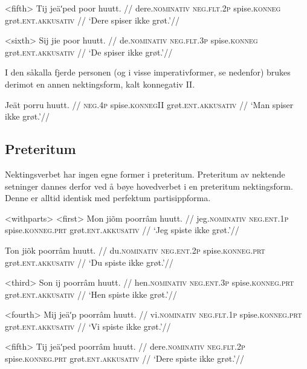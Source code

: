\a<fifth>
\begingl %
\gla Tij jeäʹped poor huutt. //
\glb dere.\textsc{nominativ} \textsc{neg.flt.2p} spise.\textsc{konneg} grøt.\textsc{ent.akkusativ} //
\glft `Dere spiser ikke grøt.'//
\endgl

\a<sixth>
\begingl %
\gla Sij jie poor huutt. //
\glb de.\textsc{nominativ} \textsc{neg.flt.3p} spise.\textsc{konneg} grøt.\textsc{ent.akkusativ} //
\glft `De spiser ikke grøt.'//
\endgl
\xe

I den såkalla fjerde personen (og i visse imperativformer, se nedenfor) brukes derimot en annen nektingsform, kalt konnegativ II.

\begingl %
\gla Jeät porru huutt. //
\glb \textsc{neg.4p} spise.\textsc{konnegII} grøt.\textsc{ent.akkusativ} //
\glft `Man spiser ikke grøt.'//
\endgl

\xe


\subsection{Preteritum}

Nektingsverbet har ingen egne former i preteritum. Preteritum av nektende setninger dannes derfor ved å bøye hovedverbet i en preteritum nektingsform. Denne er alltid identisk med perfektum partisippforma.

\pex<withparts> %
\a<first> %
\begingl %
\gla Mon jiõm poorrâm huutt. //
\glb jeg.\textsc{nominativ} \textsc{neg.ent.1p} spise.\textsc{konneg.prt} grøt.\textsc{ent.akkusativ} //
\glft `Jeg spiste ikke grøt.'//
\endgl

\begingl %
\gla Ton jiõk poorrâm huutt. //
\glb du.\textsc{nominativ} \textsc{neg.ent.2p} spise.\textsc{konneg.prt} grøt.\textsc{ent.akkusativ} //
\glft `Du spiste ikke grøt.'//
\endgl

\a<third>
\begingl %
\gla Son ij poorrâm huutt. //
\glb hen.\textsc{nominativ} \textsc{neg.ent.3p} spise.\textsc{konneg.prt} grøt.\textsc{ent.akkusativ} //
\glft `Hen spiste ikke grøt.'//
\endgl

\a<fourth>
\begingl %
\gla Mij jeäʹp poorrâm huutt. //
\glb vi.\textsc{nominativ} \textsc{neg.flt.1p} spise.\textsc{konneg.prt} grøt.\textsc{ent.akkusativ} //
\glft `Vi spiste ikke grøt.'//
\endgl

\a<fifth>
\begingl %
\gla Tij jeäʹped poorrâm huutt. //
\glb dere.\textsc{nominativ} \textsc{neg.flt.2p} spise.\textsc{konneg.prt} grøt.\textsc{ent.akkusativ} //
\glft `Dere spiste ikke grøt.'//
\endgl


